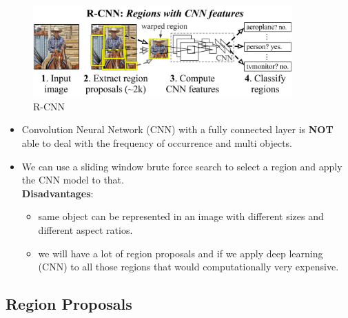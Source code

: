 \begin{figure}[H]
    \centering
    \includegraphics[width=\linewidth, height=3.5cm, keepaspectratio]{Pictures/convolutional-neural-network/rcnn-splash-method.jpg}
    \caption{R-CNN}
\end{figure}

\begin{itemize}
    \item Convolution Neural Network (CNN) with a fully connected layer is \textbf{NOT} able to deal with the frequency of occurrence and multi objects.

    \item We can use a sliding window brute force search to select a region and apply the CNN model to that.\\
    \textbf{Disadvantages}:
    \begin{itemize}
        \item same object can be represented in an image with different sizes and different aspect ratios.

        \item we will have a lot of region proposals and if we apply deep learning (CNN) to all those regions that would computationally very expensive.

    \end{itemize}
    
\end{itemize}

\subsection{Region Proposals \cite{arxiv-1311.2524v5-rcnn,https://www.geeksforgeeks.org/r-cnn-region-based-cnns/}}

